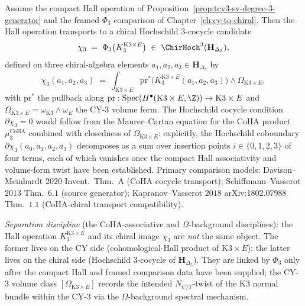\begin{remark}
\label{rem:tcy3-phi-transport-chi-3}
Assume the compact Hall operation of
Proposition~\ref{prop:tcy3-sv-degree-3-generator} and the framed
$\Phi_3$ comparison of Chapter~\ref{ch:cy-to-chiral}. Then the Hall
operation transports to a chiral Hochschild $3$-cocycle candidate
\[
 \chi_3 \;=\; \Phi_3\bigl(K_3^{\mathrm{K3}\times E}\bigr)
 \;\in\; \ChirHoch^3(\mathbf{H}_{\Delta_5}),
\]
defined on three chiral-algebra elements $a_1, a_2, a_3 \in
\mathbf{H}_{\Delta_5}$ by
\begin{equation}
\label{eq:tcy3-chi-3-explicit}
 \chi_3(a_1, a_2, a_3)
 \;=\;
 \int_{\mathrm{K3}\times E}
 \mathrm{pr}^*\bigl(K_3^{\mathrm{K3}\times E}(a_1, a_2, a_3)\bigr)
 \wedge
 \Omega_{\mathrm{K3}\times E},
\end{equation}
with $\mathrm{pr}^*$ the pullback along
$\mathrm{pr} : \mathrm{Spec}(H^\bullet(\mathrm{K3}\times E,\Z))
\to \mathrm{K3}\times E$ and $\Omega_{\mathrm{K3}\times E} =
\omega_{\mathrm{K3}}\wedge\omega_E$ the CY-$3$ volume form. The
Hochschild cocycle condition $\partial\chi_3 = 0$ would follow from the
Maurer--Cartan equation for the CoHA product
$\mu_3^{\mathrm{CoHA}}$ combined with closedness of
$\Omega_{\mathrm{K3}\times E}$: explicitly, the Hochschild coboundary
$\partial\chi_3(a_0, a_1, a_2, a_3)$ decomposes as a sum over
insertion points $i \in \{0, 1, 2, 3\}$ of four terms, each of which
vanishes once the compact Hall associativity and volume-form twist have
been established. Primary comparison models:
Davison--Meinhardt $2020$ Invent.\ Thm.\ A (CoHA cocycle transport);
Schiffmann--Vasserot $2013$ Thm.\ $6.1$ (source generator);
Kapranov--Vasserot $2018$ arXiv:1802.07988 Thm.\ $1.1$ (CoHA-chiral
transport compatibility).

\emph{Separation discipline} (the CoHA-associative and $\Omega$-background disciplines): the
Hall operation $K_3^{\mathrm{K3}\times E}$ and its chiral image
$\chi_3$ are \emph{not} the same object. The former lives on the CY
side (cohomological-Hall product of $\mathrm{K3}\times E$); the
latter lives on the chiral side (Hochschild $3$-cocycle of
$\mathbf{H}_{\Delta_5}$). They are linked by $\Phi_3$ only after the
compact Hall and framed comparison data have been supplied; the CY-$3$
volume class $[\Omega_{\mathrm{K3}\times E}]$ records the intended
$N_{C/Y}$-twist of the K3 normal bundle within the CY-$3$ via the
$\Omega$-background spectral mechanism.
\end{remark}

